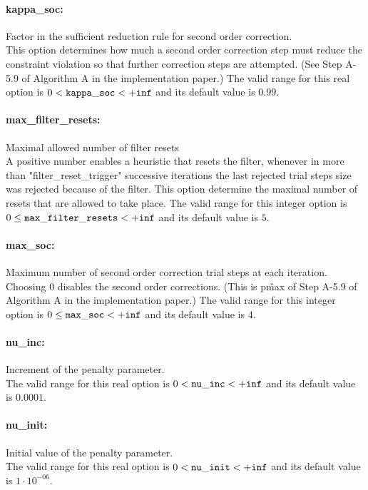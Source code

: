 \paragraph{kappa\_soc:}\label{sec:kappa_soc} Factor in the sufficient reduction rule for second order correction. $\;$ \\
 This option determines how much a second order
correction step must reduce the constraint
violation so that further correction steps are
attempted.  (See Step A-5.9 of Algorithm A in the
implementation paper.) The valid range for this real option is 
$0 <  {\tt kappa\_soc } <  {\tt +inf}$
and its default value is $0.99$.


\paragraph{max\_filter\_resets:}\label{sec:max_filter_resets} Maximal allowed number of filter resets $\;$ \\
 A positive number enables a heuristic that resets
the filter, whenever in more than
"filter\_reset\_trigger" successive iterations
the last rejected trial steps size was rejected
because of the filter.  This option determine the
maximal number of resets that are allowed to take
place. The valid range for this integer option is
$0 \le {\tt max\_filter\_resets } <  {\tt +inf}$
and its default value is $5$.


\paragraph{max\_soc:}\label{sec:max_soc} Maximum number of second order correction trial steps at each iteration. $\;$ \\
 Choosing 0 disables the second order corrections.
(This is p\^{max} of Step A-5.9 of Algorithm A in
the implementation paper.) The valid range for this integer option is
$0 \le {\tt max\_soc } <  {\tt +inf}$
and its default value is $4$.


\paragraph{nu\_inc:}\label{sec:nu_inc} Increment of the penalty parameter. $\;$ \\
 The valid range for this real option is 
$0 <  {\tt nu\_inc } <  {\tt +inf}$
and its default value is $0.0001$.


\paragraph{nu\_init:}\label{sec:nu_init} Initial value of the penalty parameter. $\;$ \\
 The valid range for this real option is 
$0 <  {\tt nu\_init } <  {\tt +inf}$
and its default value is $1 \cdot 10^{-06}$.



